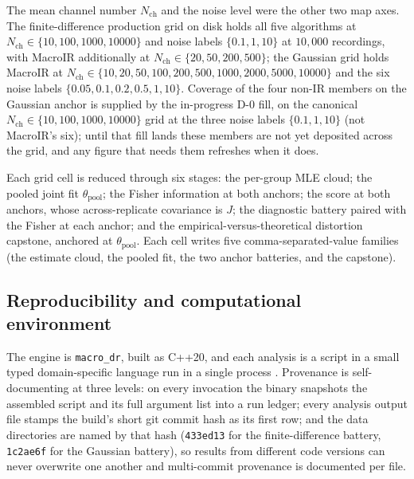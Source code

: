The mean channel number $N_{\mathrm{ch}}$ and the noise level were the other two map
axes. The finite-difference production grid on disk holds all five algorithms at
$N_{\mathrm{ch}} \in \{10, 100, 1000, 10000\}$ and noise labels $\{0.1, 1, 10\}$ at
$10{,}000$ recordings, with MacroIR additionally at
$N_{\mathrm{ch}} \in \{20, 50, 200, 500\}$; the Gaussian grid holds MacroIR at
$N_{\mathrm{ch}} \in \{10, 20, 50, 100, 200, 500, 1000, 2000, 5000, 10000\}$ and the
six noise labels $\{0.05, 0.1, 0.2, 0.5, 1, 10\}$. Coverage of the four non-IR
members on the Gaussian anchor is supplied by the in-progress D-0 fill, on the
canonical $N_{\mathrm{ch}} \in \{10, 100, 1000, 10000\}$ grid at the three noise
labels $\{0.1, 1, 10\}$ (not MacroIR's six); until that fill lands these members are
not yet deposited across the grid, and any figure that needs them refreshes when it
does.

Each grid cell is reduced through six stages: the per-group MLE cloud; the pooled
joint fit $\theta_{\mathrm{pool}}$; the Fisher information at both anchors; the score
at both anchors, whose across-replicate covariance is $J$; the diagnostic battery
paired with the Fisher at each anchor; and the empirical-versus-theoretical
distortion capstone, anchored at $\theta_{\mathrm{pool}}$. Each cell writes five
comma-separated-value families (the estimate cloud, the pooled fit, the two
anchor batteries, and the capstone).

\subsection*{Reproducibility and computational environment}

The engine is \texttt{macro\_dr}, built as C++20, and each analysis is a script in a
small typed domain-specific language run in a single process
\citep{moffatt2025macroir}. Provenance is self-documenting at three levels: on every
invocation the binary snapshots the assembled script and its full argument list into
a run ledger; every analysis output file stamps the build's short git commit hash as
its first row; and the data directories are named by that hash (\texttt{433ed13} for
the finite-difference battery, \texttt{1c2ae6f} for the Gaussian battery), so results
from different code versions can never overwrite one another and multi-commit
provenance is documented per file.

